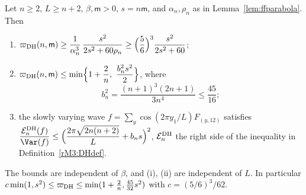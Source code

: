 \begin{theorem}
\label{rM3:DH}
Let $n\ge2$, $L\ge n+2$, $\beta,\mathsf m>0$, $s=n\mathsf m$, and
$\alpha_n,\rho_n$ as in Lemma~\ref{lem:ffparabola}. Then
\begin{enumerate}[label=\textup{(\roman*)},leftmargin=*]
\item $\displaystyle\varpi_{\rm DH}(n,\mathsf m)\ge\frac1{\alpha_n^3}\,
\frac{s^2}{2s^2+60\rho_n}\ge\Bigl(\frac56\Bigr)^3\frac{s^2}{2s^2+60}$;
\item $\displaystyle\varpi_{\rm DH}(n,\mathsf m)\le\min\Bigl\{1+\frac2n,\
\frac{b_n^2s^2}2\Bigr\}$, where
\[
b_n^2=\frac{(n+1)^3(2n+1)}{3n^4}\le\frac{45}{16};
\]
\item the slowly varying wave $f=\sum_y\cos(2\pi y_1/L)F_{(y,12)}$ satisfies
$\displaystyle\frac{\mathcal E^{\rm DH}_n(f)}{\Var(f)}\le\Bigl(\frac{2\pi
\sqrt{2n(n+2)}}L+b_ns\Bigr)^2$, $\mathcal E^{\rm DH}_n$ the right side
of the inequality in Definition~\ref{rM3:DHdef}.
\end{enumerate}
The bounds are independent of $\beta$, and (i), (ii) are independent of
$L$. In particular $c\min(1,s^2)\le\varpi_{\rm DH}\le\min(1+\frac2n,
\frac{45}{32}s^2)$ with $c=(5/6)^3/62$.
\end{theorem}

